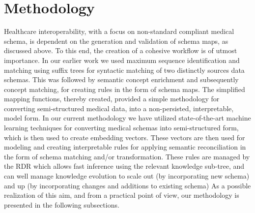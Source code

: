 
\section*{Methodology}
\label{methodology}
Healthcare interoperability, with a focus on non-standard compliant medical schema, is dependent on the generation and validation of schema maps, as discussed above. To this end, the creation of a cohesive workflow is of utmost importance. In our earlier work \cite{Satti2020} we used maximum sequence identification and matching using suffix trees for syntactic matching of two distinctly sources data schemas. This was followed by semantic concept enrichment and subsequently concept matching, for creating rules in the form of schema maps. The simplified mapping functions, thereby created, provided a simple methodology for converting semi-structured medical data, into a non-persisted, interpretable, model form.
In our current methodology we have utilized state-of-the-art machine learning techniques for converting medical schemas into semi-structured form, which is then used to create embedding vectors. These vectors are then used for modeling and creating interpretable rules for applying semantic reconciliation in the form of schema matching and/or transformation. These rules are managed by the RDR which allows fast inference using the relevant knowledge sub-tree, and can well manage knowledge evolution to scale out (by incorporating new schema) and up (by incorporating changes and additions to existing schema)
As a possible realization of this aim, and from a practical point of view, our methodology is presented in the following subsections.

